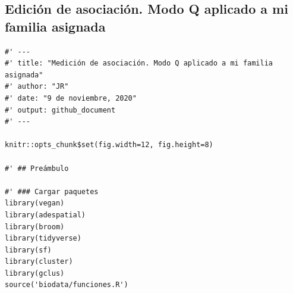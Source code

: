 \documentclass[11pt,]{article}
\begin{document}
\subsection{Edición de asociación. Modo Q aplicado a mi familia
asignada}\label{ediciuxf3n-de-asociaciuxf3n.-modo-q-aplicado-a-mi-familia-asignada}

\begin{verbatim}
#' ---
#' title: "Medición de asociación. Modo Q aplicado a mi familia asignada"
#' author: "JR"
#' date: "9 de noviembre, 2020"
#' output: github_document
#' ---

knitr::opts_chunk$set(fig.width=12, fig.height=8)

#' ## Preámbulo

#' ### Cargar paquetes
library(vegan)
library(adespatial)
library(broom)
library(tidyverse)
library(sf)
library(cluster)
library(gclus)
source('biodata/funciones.R')


\end{verbatim}
\end{document}
